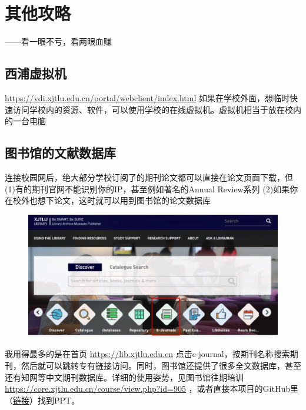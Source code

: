 
\chapter{其他攻略}

\begin{flushright}
    ——看一眼不亏，看两眼血赚
\end{flushright}

 \clearpage

 \clearpage

 \clearpage

 \clearpage

\section{西浦虚拟机}
\url{https://vdi.xjtlu.edu.cn/portal/webclient/index.html}
如果在学校外面，想临时快速访问学校内的资源、软件，可以使用学校的在线虚拟机。虚拟机相当于放在校内的一台电脑

\section{图书馆的文献数据库}
连接校园网后，绝大部分学校订阅了的期刊论文都可以直接在论文页面下载，但(1)有的期刊官网不能识别你的IP，甚至例如著名的Annual Review系列 (2)如果你在校外也想下论文，这时就可以用到图书馆的论文数据库

\begin{figure}[H]
    \includegraphics[width=0.7\columnwidth, center]{author-folder/Kai.Wu/library-ejournal.jpg}
\end{figure}

我用得最多的是在首页 \url{https://lib.xjtlu.edu.cn} 点击e-journal，按期刊名称搜索期刊，然后就可以跳转专有链接访问。同时，图书馆还提供了很多全文数据库，甚至还有知网等中文期刊数据库。详细的使用姿势，见图书馆往期培训 \url{https://core.xjtlu.edu.cn/course/view.php?id=905} ，或者直接本项目的GitHub里（\href{https://github.com/kaiwu-astro/xp_pgrs_unofficial_guide/tree/main/fileshare}{链接}）找到PPT。

